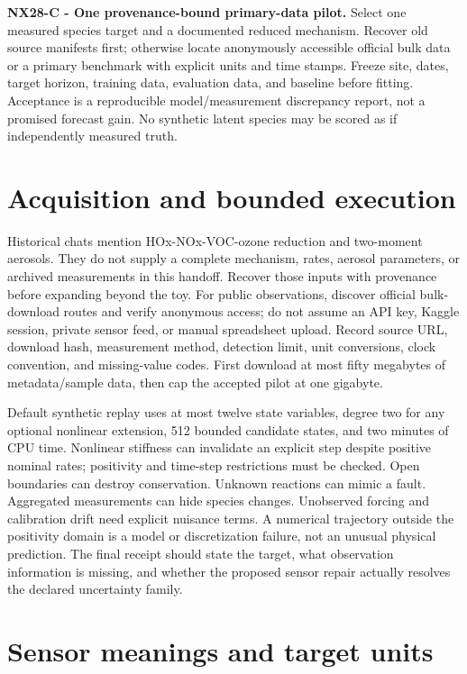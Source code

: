 \documentclass[
  11pt,
  a4paper,
]{report}
\begin{document}
\textbf{NX28-C - One provenance-bound primary-data pilot.} Select one
measured species target and a documented reduced mechanism. Recover old
source manifests first; otherwise locate anonymously accessible official
bulk data or a primary benchmark with explicit units and time stamps.
Freeze site, dates, target horizon, training data, evaluation data, and
baseline before fitting. Acceptance is a reproducible model/measurement
discrepancy report, not a promised forecast gain. No synthetic latent
species may be scored as if independently measured truth.

\hypertarget{acquisition-and-bounded-execution}{%
\section{Acquisition and bounded
execution}\label{acquisition-and-bounded-execution}}

Historical chats mention HOx-NOx-VOC-ozone reduction and two-moment
aerosols. They do not supply a complete mechanism, rates, aerosol
parameters, or archived measurements in this handoff. Recover those
inputs with provenance before expanding beyond the toy. For public
observations, discover official bulk-download routes and verify
anonymous access; do not assume an API key, Kaggle session, private
sensor feed, or manual spreadsheet upload. Record source URL, download
hash, measurement method, detection limit, unit conversions, clock
convention, and missing-value codes. First download at most fifty
megabytes of metadata/sample data, then cap the accepted pilot at one
gigabyte.

Default synthetic replay uses at most twelve state variables, degree two
for any optional nonlinear extension, 512 bounded candidate states, and
two minutes of CPU time. Nonlinear stiffness can invalidate an explicit
step despite positive nominal rates; positivity and time-step
restrictions must be checked. Open boundaries can destroy conservation.
Unknown reactions can mimic a fault. Aggregated measurements can hide
species changes. Unobserved forcing and calibration drift need explicit
nuisance terms. A numerical trajectory outside the positivity domain is
a model or discretization failure, not an unusual physical prediction.
The final receipt should state the target, what observation information
is missing, and whether the proposed sensor repair actually resolves the
declared uncertainty family.

\hypertarget{sensor-meanings-and-target-units}{%
\section{Sensor meanings and target
units}\label{sensor-meanings-and-target-units}}
\end{document}
